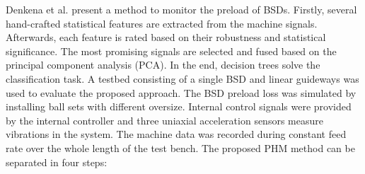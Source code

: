 Denkena et al. \cite{Denkena2021} present a method to monitor the preload of BSDs. Firstly, several hand-crafted statistical features are extracted from the machine signals. Afterwards, each feature is rated based on their robustness and statistical significance. The most promising signals are selected and fused based on the principal component analysis (PCA). In the end, decision trees solve the classification task. A testbed consisting of a single BSD and linear guideways was used to evaluate the proposed approach. The BSD preload loss was simulated by installing ball sets with different oversize. Internal control signals were provided by the internal controller and three uniaxial acceleration sensors measure vibrations in the system. The machine data was recorded during constant feed rate over the whole length of the test bench. The proposed PHM method can be separated in four steps:

